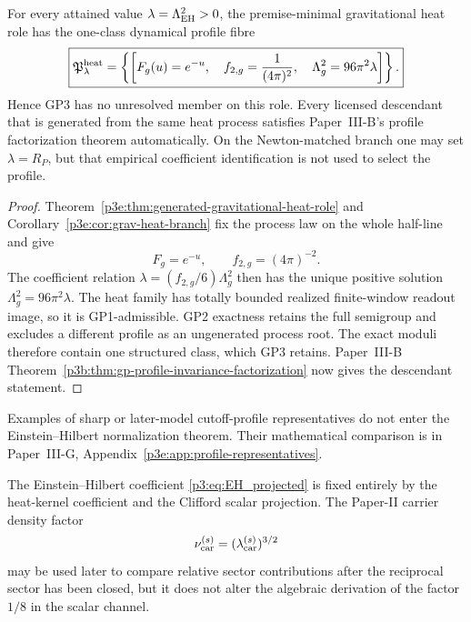 \documentclass[12pt,a4paper]{article}
\begin{document}
\begin{corollary}
\label{p3e:cor:singleton-heat-profile-fibre}
For every attained value \(\lambda=\Lambda_{\rm EH}^2>0\), the premise-minimal
gravitational heat role has the one-class dynamical profile fibre
\begin{equation}
 \label{p3e:eq:singleton-heat-profile-fibre}
 \boxed{
 \mathfrak P^{\rm heat}_\lambda
 =\left\{
  \left[
   F_g(u)=e^{-u},\quad
   f_{2,g}=\frac1{(4\pi)^2},\quad
   \Lambda_g^2=96\pi^2\lambda
  \right]
 \right\}.}
\end{equation}
Hence GP3 has no unresolved member on this role.  Every licensed descendant
that is generated from the same heat process satisfies Paper~III-B's profile
factorization theorem automatically.  On the Newton-matched branch one may
set \(\lambda=R_P\), but that empirical coefficient identification is not used
to select the profile.
\end{corollary}

\begin{proof}
Theorem~\ref{p3e:thm:generated-gravitational-heat-role} and
Corollary~\ref{p3e:cor:grav-heat-branch} fix the process law on the whole
half-line and give
\[
 F_g=e^{-u},\qquad f_{2,g}=(4\pi)^{-2}.
\]
The coefficient relation
\(\lambda=(f_{2,g}/6)\Lambda_g^2\) then has the unique positive solution
\(\Lambda_g^2=96\pi^2\lambda\).  The heat family has totally bounded realized
finite-window readout image, so it is GP1-admissible.  GP2 exactness retains
the full semigroup and excludes a different profile as an ungenerated process
root.  The exact moduli therefore contain one structured class, which GP3
retains.  Paper~III-B
Theorem~\ref{p3b:thm:gp-profile-invariance-factorization} now gives the
descendant statement.
\end{proof}

\begin{remark}
Examples of sharp or later-model cutoff-profile representatives do not enter
the Einstein--Hilbert normalization theorem.  Their mathematical comparison is in
Paper~III-G, Appendix~\ref{p3e:app:profile-representatives}.
\end{remark}

\begin{remark}
The Einstein--Hilbert coefficient \eqref{p3:eq:EH_projected} is fixed entirely by the heat-kernel coefficient and the Clifford scalar projection.  The Paper-II carrier density factor
\[
\nu_{\rm car}^{(s)}=(\lambda_{\rm car}^{(s)})^{3/2}
\]
may be used later to compare relative sector contributions after the reciprocal sector has been closed, but it does not alter the algebraic derivation of the factor $1/8$ in the scalar channel.
\end{remark}
\end{document}
